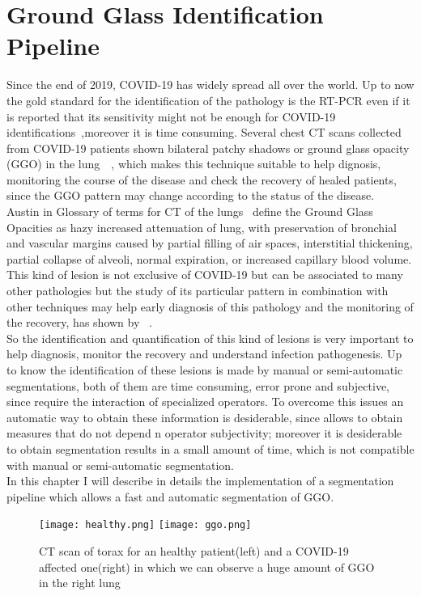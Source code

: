 \documentclass{standalone}
\begin{document}
	\chapter{Ground Glass Identification Pipeline}
	
	Since the end of 2019, COVID-19 has widely spread all over the world. Up to now the gold standard for the identification of the pathology is the 
	RT-PCR even if it is reported that its sensitivity might not be enough for COVID-19 identifications~\cite{ART:Ai},moreover it is time consuming. Several chest CT scans collected from COVID-19 patients shown bilateral patchy shadows or ground glass opacity (GGO) in the 
	lung~\cite{ART:Ai}~\cite{ART:Wang}, which makes this technique suitable to help dignosis, monitoring the course of the disease and check the recovery of healed patients, since the GGO pattern may change according to the status of the disease.\\
	Austin in Glossary of terms for CT of the lungs~\cite{ART:Austin} define the Ground Glass Opacities as hazy increased attenuation of lung, with 
	preservation of bronchial and vascular margins caused by partial filling of air spaces, interstitial thickening, partial collapse of alveoli, normal 
	expiration, or increased capillary blood volume. This kind of lesion is not exclusive of COVID-19 but can be associated to many other pathologies 
	but the study of its particular pattern in combination with other techniques may help early diagnosis of this pathology and the monitoring of the 
	recovery, has shown by ~\cite{ART:Bernheim}.\\
	
	So the identification and quantification of this kind of lesions is very important to help diagnosis, monitor the recovery and understand infection 
	pathogenesis. Up to know the identification of these lesions is made by manual or semi-automatic segmentations, both of them are time consuming, 
	error prone and subjective, since require the interaction of specialized operators. To overcome this issues an automatic way to obtain these information is desiderable, since allows to obtain measures that do not depend n operator subjectivity; moreover it is desiderable to obtain segmentation results in a small amount of time, which is not compatible with manual or semi-automatic segmentation.\\
	
	In this chapter I will describe in details the implementation of a segmentation pipeline which allows a fast and automatic segmentation of GGO. 
	
		 
	
	\begin{figure}\label{fig:HealthVSCovid}
		\centering
		\texttt{[image: healthy.png]}
		\quad
		\texttt{[image: ggo.png]}
		\caption{CT scan of torax for an healthy patient(left) and a COVID-19 affected one(right) in which we can observe a huge amount of GGO in the right lung}
	\end{figure} 
	
	
\end{document}
